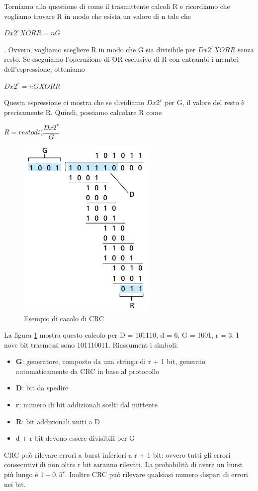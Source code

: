 \documentclass[11pt,a4paper]{book}
\begin{document}
Torniamo alla questione di come il trasmittente calcoli R e ricordiamo che vogliamo trovare R in modo che esista un valore di n tale che 
\begin{center}
	$D x 2^{r} XOR R = nG$
\end{center}. Ovvero, vogliamo scegliere R in modo che G sia divisibile per $D x 2^{r} XOR R$ senza resto. Se eseguiamo l'operazione di OR esclusivo di R con entrambi i membri dell'espressione, otteniamo 
\begin{center}
	$ D x 2^{r} = nG XOR R$
\end{center}
Questa espressione ci mostra che se dividiamo $D x 2^{r}$ per G, il valore del resto è precisamente R. Quindi, possiamo calcolare R come
\begin{center}
	$R = resto di (\dfrac{D x 2^{r}}{G}$
\end{center} 
\begin{figure}
	\begin{center}
		\includegraphics[scale=0.6]{img/074.png}
		\caption{Esempio di cacolo di CRC}
		\label{fig: 074}
	\end{center}
\end{figure}
La figura \ref{fig: 074} mostra questo calcolo per D = 101110, d = 6, G = 1001, r = 3. I nove bit trasmessi sono  101110011.
Riassument i simboli:
\begin{itemize}
	\item \textbf{G}: generatore, composto da una stringa di r + 1 bit, generato automaticamente da CRC in base al protocollo 
	\item \textbf{D}: bit da spedire
	\item \textbf{r}: numero di bit addizionali scelti dal mittente
	\item \textbf{R}: bit addizionali uniti a D
	\item d + r bit devono essere divisibili per G
\end{itemize}
CRC può rilevare errori a burst inferiori a r + 1 bit: ovvero tutti gli errori consecutivi di non oltre r bit saranno rilevati. La probabilità di avere un burst più lungo è $1 - 0,5^{r}$. Inoltre CRC può rilevare qualsiasi numero dispari di errori nei bit.
\end{document}
